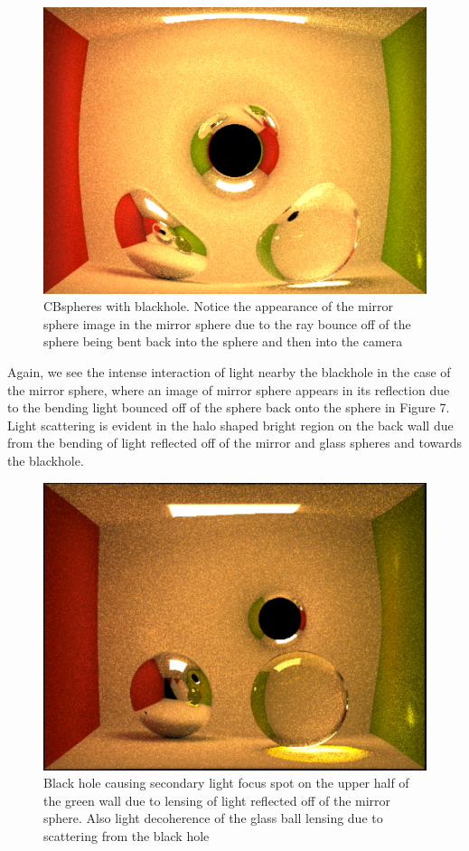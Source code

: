 \documentclass[sigconf]{acmart}
\begin{document}
\begin{figure}[h]
  \centering
  \includegraphics[width=\linewidth]{mirrors.png}
  \caption{CBspheres with blackhole.  Notice the appearance of the mirror sphere image in the mirror sphere due to the ray bounce off of the sphere being bent back into the sphere and then into the camera}
  \Description{}
\end{figure}

Again, we see the intense interaction of light nearby the blackhole in the case of the mirror sphere, where an image of mirror sphere appears in its reflection due to the bending light bounced off of the sphere back onto the sphere in Figure 7.  Light scattering is evident in the halo shaped bright region on the back wall due from the bending of light reflected off of the mirror and glass spheres and towards the blackhole.

\begin{figure}[h]
  \centering
  \includegraphics[width=\linewidth]{secondary.png}
  \caption{Black hole causing secondary light focus spot on the upper half of the green wall due to lensing of light reflected off of the mirror sphere.  Also light decoherence of the glass ball lensing due to scattering from the black hole}
  \Description{}
\end{figure}
\end{document}
